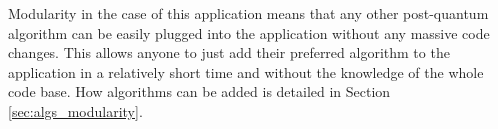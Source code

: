Modularity in the case of this application means that any other post-quantum algorithm can be easily plugged into the application without any massive code changes. This allows anyone to just add their preferred algorithm to the application in a relatively short time and without the knowledge of the whole code base. How algorithms can be added is detailed in Section \ref{sec:algs_modularity}.
